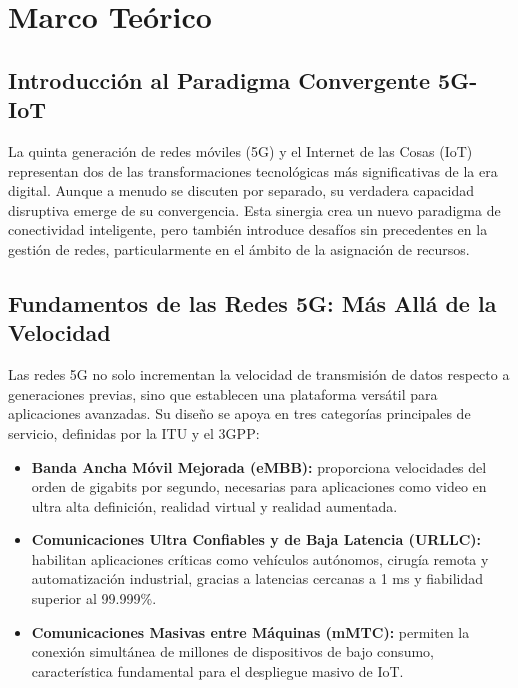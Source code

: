 \documentclass[12pt,a4paper]{article}
\begin{document}
\newpage

\newpage

\section{Marco Teórico} \label{sec:marco_teorico}

\subsection{Introducción al Paradigma Convergente 5G-IoT}

La quinta generación de redes móviles (5G) y el Internet de las Cosas (IoT) representan dos de las transformaciones tecnológicas más significativas de la era digital. Aunque a menudo se discuten por separado, su verdadera capacidad disruptiva emerge de su convergencia. Esta sinergia crea un nuevo paradigma de conectividad inteligente, pero también introduce desafíos sin precedentes en la gestión de redes, particularmente en el ámbito de la asignación de recursos.

\subsection{Fundamentos de las Redes 5G: Más Allá de la Velocidad}

Las redes 5G no solo incrementan la velocidad de transmisión de datos respecto a generaciones previas, sino que establecen una plataforma versátil para aplicaciones avanzadas. Su diseño se apoya en tres categorías principales de servicio, definidas por la ITU y el 3GPP:


\begin{itemize}
\item \textbf{Banda Ancha Móvil Mejorada (eMBB):} proporciona velocidades del orden de gigabits por segundo, necesarias para aplicaciones como video en ultra alta definición, realidad virtual y realidad aumentada.
\item \textbf{Comunicaciones Ultra Confiables y de Baja Latencia (URLLC):} habilitan aplicaciones críticas como vehículos autónomos, cirugía remota y automatización industrial, gracias a latencias cercanas a 1 ms y fiabilidad superior al 99.999\%.
\item \textbf{Comunicaciones Masivas entre Máquinas (mMTC):} permiten la conexión simultánea de millones de dispositivos de bajo consumo, característica fundamental para el despliegue masivo de IoT.
\end{itemize}
\end{document}
